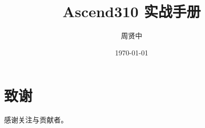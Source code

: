 \documentclass[fontsize=12pt, paper=a4, oneside, openany]{scrbook}
\title{Ascend310 实战手册}
\author{周贤中}
\date{\today}
\begin{document}
\frontmatter
\maketitle
\tableofcontents
\mainmatter

% 

\backmatter
\chapter*{致谢}
感谢关注与贡献者。
\end{document}
